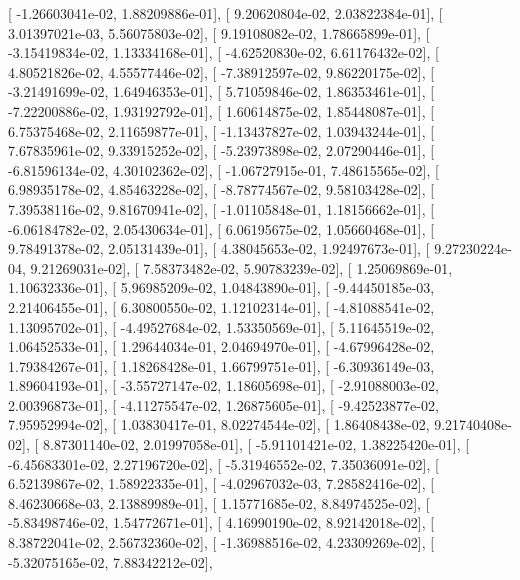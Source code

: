 \documentclass{article}
\begin{document}
       [ -1.26603041e-02,   1.88209886e-01],
       [  9.20620804e-02,   2.03822384e-01],
       [  3.01397021e-03,   5.56075803e-02],
       [  9.19108082e-02,   1.78665899e-01],
       [ -3.15419834e-02,   1.13334168e-01],
       [ -4.62520830e-02,   6.61176432e-02],
       [  4.80521826e-02,   4.55577446e-02],
       [ -7.38912597e-02,   9.86220175e-02],
       [ -3.21491699e-02,   1.64946353e-01],
       [  5.71059846e-02,   1.86353461e-01],
       [ -7.22200886e-02,   1.93192792e-01],
       [  1.60614875e-02,   1.85448087e-01],
       [  6.75375468e-02,   2.11659877e-01],
       [ -1.13437827e-02,   1.03943244e-01],
       [  7.67835961e-02,   9.33915252e-02],
       [ -5.23973898e-02,   2.07290446e-01],
       [ -6.81596134e-02,   4.30102362e-02],
       [ -1.06727915e-01,   7.48615565e-02],
       [  6.98935178e-02,   4.85463228e-02],
       [ -8.78774567e-02,   9.58103428e-02],
       [  7.39538116e-02,   9.81670941e-02],
       [ -1.01105848e-01,   1.18156662e-01],
       [ -6.06184782e-02,   2.05430634e-01],
       [  6.06195675e-02,   1.05660468e-01],
       [  9.78491378e-02,   2.05131439e-01],
       [  4.38045653e-02,   1.92497673e-01],
       [  9.27230224e-04,   9.21269031e-02],
       [  7.58373482e-02,   5.90783239e-02],
       [  1.25069869e-01,   1.10632336e-01],
       [  5.96985209e-02,   1.04843890e-01],
       [ -9.44450185e-03,   2.21406455e-01],
       [  6.30800550e-02,   1.12102314e-01],
       [ -4.81088541e-02,   1.13095702e-01],
       [ -4.49527684e-02,   1.53350569e-01],
       [  5.11645519e-02,   1.06452533e-01],
       [  1.29644034e-01,   2.04694970e-01],
       [ -4.67996428e-02,   1.79384267e-01],
       [  1.18268428e-01,   1.66799751e-01],
       [ -6.30936149e-03,   1.89604193e-01],
       [ -3.55727147e-02,   1.18605698e-01],
       [ -2.91088003e-02,   2.00396873e-01],
       [ -4.11275547e-02,   1.26875605e-01],
       [ -9.42523877e-02,   7.95952994e-02],
       [  1.03830417e-01,   8.02274544e-02],
       [  1.86408438e-02,   9.21740408e-02],
       [  8.87301140e-02,   2.01997058e-01],
       [ -5.91101421e-02,   1.38225420e-01],
       [ -6.45683301e-02,   2.27196720e-02],
       [ -5.31946552e-02,   7.35036091e-02],
       [  6.52139867e-02,   1.58922335e-01],
       [ -4.02967032e-03,   7.28582416e-02],
       [  8.46230668e-03,   2.13889989e-01],
       [  1.15771685e-02,   8.84974525e-02],
       [ -5.83498746e-02,   1.54772671e-01],
       [  4.16990190e-02,   8.92142018e-02],
       [  8.38722041e-02,   2.56732360e-02],
       [ -1.36988516e-02,   4.23309269e-02],
       [ -5.32075165e-02,   7.88342212e-02],
\end{document}

